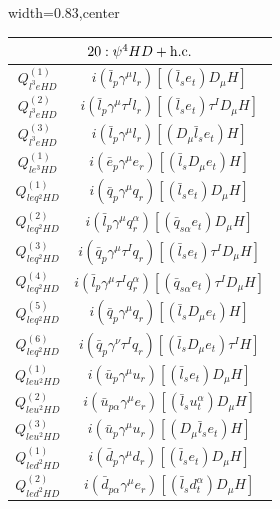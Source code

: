 
\begin{table}[H]
\begin{center}
\begin{adjustbox}{width=0.83\textwidth,center}
\small
\begin{minipage}[t]{5.4cm}
\renewcommand{\arraystretch}{1.5}
\begin{tabular}[t]{c|c}
\multicolumn{2}{c}{\boldmath$20:\psi^4HD + \mathrm{h.c.}$} \\
\hline
$Q_{l^3eHD}^{(1)}$  &  $i (\bar l_p \gamma^\mu l_r) [(\bar l_s e_t) D_\mu H]$ \\
%
$Q_{l^3eHD}^{(2)}$  &  $i (\bar l_p \gamma^\mu \tau^I l_r) [(\bar l_s e_t) \tau^I D_\mu H]$ \\
%
$Q_{l^3eHD}^{(3)}$  &  $i (\bar l_p \gamma^\mu l_r) [(D_\mu \bar l_s e_t) H]$ \\
%
$Q_{le^3HD}^{(1)}$  &  $i (\bar e_p \gamma^\mu e_r) [(\bar l_s D_\mu e_t) H]$ \\
%
$Q_{leq^2HD}^{(1)}$  &  $i (\bar q_p \gamma^\mu q_r) [(\bar l_s e_t) D_\mu H]$ \\
%
$Q_{leq^2HD}^{(2)}$  &  $i (\bar l_p \gamma^\mu q_r^\alpha) [(\bar q_{s\alpha} e_t) D_\mu H]$ \\
%
$Q_{leq^2HD}^{(3)}$  &  $i (\bar q_p \gamma^\mu \tau^I q_r) [(\bar l_s e_t) \tau^I D_\mu H]$ \\
%
$Q_{leq^2HD}^{(4)}$  &  $i (\bar l_p \gamma^\mu \tau^I q_r^\alpha) [(\bar q_{s\alpha} e_t) \tau^I D_\mu H]$ \\
%
$Q_{leq^2HD}^{(5)}$  &  $i (\bar q_p \gamma^\mu q_r) [(\bar l_s D_\mu e_t) H]$ \\
%
$Q_{leq^2HD}^{(6)}$  &  $i (\bar q_p \gamma^\nu \tau^I q_r) [(\bar l_s D_\mu e_t) \tau^I H]$ \\
%
$Q_{leu^2HD}^{(1)}$  &  $i (\bar u_p \gamma^\mu u_r) [(\bar l_s e_t) D_\mu H]$ \\
%
$Q_{leu^2HD}^{(2)}$  &  $i (\bar u_{p\alpha} \gamma^\mu e_r) [(\bar l_s u_t^\alpha) D_\mu H]$ \\
%
$Q_{leu^2HD}^{(3)}$  &  $i (\bar u_p \gamma^\mu u_r) [(D_\mu \bar l_s e_t) H]$\\
%
$Q_{led^2HD}^{(1)}$  &  $i (\bar d_p \gamma^\mu d_r) [(\bar l_s e_t) D_\mu H]$ \\
%
$Q_{led^2HD}^{(2)}$  &  $i (\bar d_{p\alpha} \gamma^\mu e_r) [(\bar l_s d_t^\alpha) D_\mu H]$ \\

\end{tabular}
\end{minipage}
\end{adjustbox}
\end{center}
\end{table}
